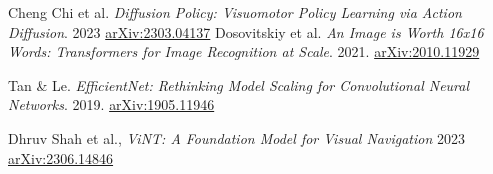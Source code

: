 \documentclass[12pt]{article}
\begin{document}
\begin{appendices}
\begin{thebibliography}{9}
Cheng Chi et al.
\textit{Diffusion Policy: Visuomotor Policy Learning via Action Diffusion}.
2023
\href{https://arxiv.org/abs/2303.04137}{arXiv:2303.04137}
Dosovitskiy et al. 
\textit{An Image is Worth 16x16 Words: Transformers for Image Recognition at Scale}. 
2021. 
\href{https://arxiv.org/abs/2010.11929}{arXiv:2010.11929}

Tan \& Le. 
\textit{EfficientNet: Rethinking Model Scaling for Convolutional Neural Networks}. 
2019. 
\href{https://arxiv.org/abs/1905.11946}{arXiv:1905.11946}

Dhruv Shah et al.,
\textit{ViNT: A Foundation Model for Visual Navigation} 2023
\href{https://arxiv.org/abs/2306.14846}{arXiv:2306.14846}
\end{thebibliography}
\end{appendices}
\end{document}
